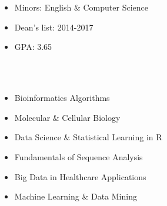 \documentclass[hidelinks, 11pt]{article}
\begin{document}
\section*{}
\begin{addmargin}{.5in}

  \begin{itemize}\setlength\itemsep{-4pt}
    \item{Minors: English $\&$ Computer Science}
    \item{Dean's list: 2014-2017}
    \item{GPA: 3.65}
  \end{itemize}
   \\ \\
  \vspace{-9pt}
  \begin{multicols}{2}
    \begin{itemize}\setlength\itemsep{-4pt}
      \item{Bioinformatics Algorithms}
      \item{Molecular $\&$ Cellular Biology}
      \item{Data Science $\&$ Statistical Learning in R}
      \item{Fundamentals of Sequence Analysis}
      \item{Big Data in Healthcare Applications}
      \item{Machine Learning $\&$ Data Mining}
    \end{itemize}
  \end{multicols}
\end{addmargin}
\vspace{-6pt}

\end{document}
